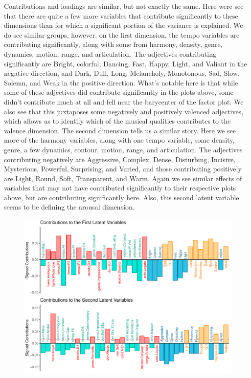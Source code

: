 \documentclass[
  english,
  man,floatsintext]{apa6}
\begin{document}
Contributions and loadings are similar, but not exactly the same. Here were see that there are quite a few more variables that contribute significantly to these dimensions than for which a significant portion of the variance is explained. We do see similar groups, however: on the first dimension, the tempo variables are contributing significantly, along with some from harmony, density, genre, dynamics, motion, range, and articulation. The adjectives contributing significantly are Bright, colorful, Dancing, Fast, Happy, Light, and Valiant in the negative direction, and Dark, Dull, Long, Melancholy, Monotonous, Sad, Slow, Solemn, and Weak in the positive direction. What's notable here is that while some of these adjectives did contribute significantly in the plots above, some didn't contribute much at all and fell near the barycenter of the factor plot. We also see that this juxtaposes some negatively and positively valenced adjectives, which allows us to identify which of the musical qualities contributes to the valence dimension.
The second dimension tells us a similar story. Here we see more of the harmony variables, along with one tempo variable, some density, genre, a few dynamics, contour, motion, range, and articulation. The adjectives contributing negatively are Aggressive, Complex, Dense, Disturbing, Incisive, Mysterious, Powerful, Surprising, and Varied, and those contributing positively are Light, Round, Soft, Transparent, and Warm. Again we see similar effects of variables that may not have contributed significantly to their respective plots above, but are contributing significantly here. Also, this second latent variable seems to be defining the arousal dimension.

\begin{figure}

{\centering \includegraphics{Music-Descriptor-Space_files/figure-latex/contsplsc-1} 

}

\caption{ }\label{fig:contsplsc}
\end{figure}
\end{document}
